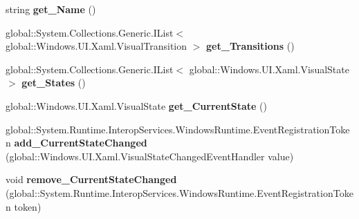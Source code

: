 \begin{DoxyCompactItemize}
\mbox{\label{interface_windows_1_1_u_i_1_1_xaml_1_1_i_visual_state_group_aefa260736063a0253bd7b1d360e5dcf0}} 
string {\bfseries get\+\_\+\+Name} ()
\item 
\mbox{\label{interface_windows_1_1_u_i_1_1_xaml_1_1_i_visual_state_group_ac26b8d69e72571edcee2b7ad46c3b2b1}} 
global\+::\+System.\+Collections.\+Generic.\+I\+List$<$ global\+::\+Windows.\+U\+I.\+Xaml.\+Visual\+Transition $>$ {\bfseries get\+\_\+\+Transitions} ()
\item 
\mbox{\label{interface_windows_1_1_u_i_1_1_xaml_1_1_i_visual_state_group_a40eeb37ab129bd4e82ee51c795415b77}} 
global\+::\+System.\+Collections.\+Generic.\+I\+List$<$ global\+::\+Windows.\+U\+I.\+Xaml.\+Visual\+State $>$ {\bfseries get\+\_\+\+States} ()
\item 
\mbox{\label{interface_windows_1_1_u_i_1_1_xaml_1_1_i_visual_state_group_a2994cf852dde78fbd8e46dfff9698768}} 
global\+::\+Windows.\+U\+I.\+Xaml.\+Visual\+State {\bfseries get\+\_\+\+Current\+State} ()
\item 
\mbox{\label{interface_windows_1_1_u_i_1_1_xaml_1_1_i_visual_state_group_ad6ee000116bc2b2c74786dee0efd418c}} 
global\+::\+System.\+Runtime.\+Interop\+Services.\+Windows\+Runtime.\+Event\+Registration\+Token {\bfseries add\+\_\+\+Current\+State\+Changed} (global\+::\+Windows.\+U\+I.\+Xaml.\+Visual\+State\+Changed\+Event\+Handler value)
\item 
\mbox{\label{interface_windows_1_1_u_i_1_1_xaml_1_1_i_visual_state_group_a851cf8f9cf416f903308f91d9dc794cb}} 
void {\bfseries remove\+\_\+\+Current\+State\+Changed} (global\+::\+System.\+Runtime.\+Interop\+Services.\+Windows\+Runtime.\+Event\+Registration\+Token token)
\item 
\mbox{\label{interface_windows_1_1_u_i_1_1_xaml_1_1_i_visual_state_group_a15af6808561ea3eb12afb9f3dc76cfb7}} 

\end{DoxyCompactItemize}

